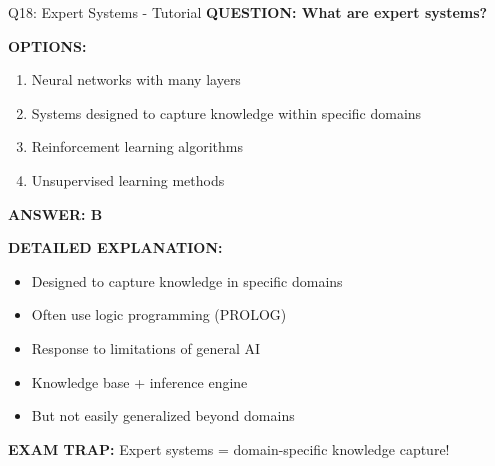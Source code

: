 \documentclass[8pt]{beamer}
\begin{document}
	\begin{frame}{Q18: Expert Systems - Tutorial}
		\fontsize{6.5}{7.5}\selectfont
		\textbf{QUESTION: What are expert systems?}
		
		\vspace{0.1cm}
		\textbf{OPTIONS:}
		\begin{enumerate}
			\item Neural networks with many layers
			\item Systems designed to capture knowledge within specific domains
			\item Reinforcement learning algorithms
			\item Unsupervised learning methods
		\end{enumerate}
		
		\vspace{0.1cm}
		\textcolor{myblue}{\textbf{ANSWER: B}}
		
		\vspace{0.1cm}
		\textbf{DETAILED EXPLANATION:}
		\begin{itemize}
			\item Designed to capture knowledge in specific domains
			\item Often use logic programming (PROLOG)
			\item Response to limitations of general AI
			\item Knowledge base + inference engine
			\item But not easily generalized beyond domains
		\end{itemize}
		
		\vspace{0.1cm}
		\textcolor{myred}{\textbf{EXAM TRAP:}} Expert systems = \textcolor{myblue}{domain-specific knowledge capture}!
	\end{frame}
	
\end{document}
